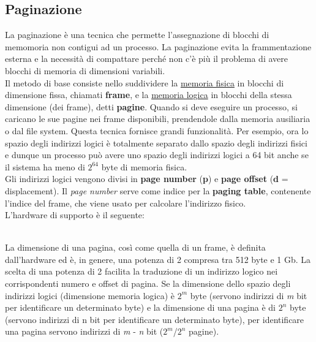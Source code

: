 \documentclass{article}
\begin{document}
		\subsection{Paginazione}
			La paginazione è una tecnica che permette l'assegnazione di blocchi di memomoria non contigui ad un processo. La paginazione evita la frammentazione esterna e la necessità di compattare perché non c'è più il problema di avere blocchi di memoria di dimensioni variabili. 
			\\Il metodo di base consiste nello suddividere la \underline{memoria fisica} in blocchi di dimensione fissa, chiamati \textbf{frame}, e la \underline{memoria logica} in blocchi della stessa dimensione (dei frame), detti \textbf{pagine}. Quando si deve eseguire un processo, si caricano le sue pagine nei frame disponibili, prendendole dalla memoria ausiliaria o dal file system. Questa tecnica fornisce grandi funzionalità. Per esempio, ora lo spazio degli indirizzi logici è totalmente separato dallo spazio degli indirizzi fisici e dunque un processo può avere uno spazio degli indirizzi logici a 64 bit anche se il sistema ha meno di $2^{64}$ byte di memoria fisica.
			\\Gli indirizzi logici vengono divisi in \textbf{page number} (\textbf{p}) e \textbf{page offset} (\textbf{d} = displacement). Il \textit{page number} serve come indice per la \textbf{paging table}, contenente l'indice del frame, che viene usato per calcolare l'indirizzo fisico.
			\\L'hardware di supporto è il seguente:
			\begin{figure}[ht!]
			\end{figure}
			\\La dimensione di una pagina, così come quella di un frame, è definita dall’hardware ed è, in genere, una potenza di 2 compresa tra 512 byte e 1 Gb. La scelta di una potenza di 2 facilita la traduzione di un indirizzo logico nei corrispondenti numero e offset di pagina. Se la dimensione dello spazio degli indirizzi logici (dimensione memoria logica) è \textit{$2^{m}$} byte (servono indirizzi di \textit{m} bit per identificare un determinato byte) e la dimensione di una pagina è di \textit{$2^{n}$} byte (servono indirizzi di n bit per identificare un determinato byte), per identificare una pagina servono indirizzi di \textit{m} - \textit{n} bit ($2^{m}$/$2^{n}$ pagine).
\end{document}
